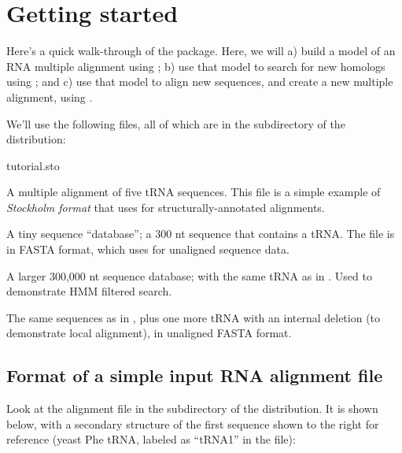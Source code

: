 \section{Getting started}

Here's a quick walk-through of the package. Here, we will
a) build a model of an RNA multiple alignment using
         ;
b) use that model to search for new homologs using
         ;
and c) use that model to align new sequences, and create a 
         new multiple alignment, using .

We'll use the following files, all of which are in the 
subdirectory of the distribution:

  \begin{sreitems}{tutorial.sto}
  \item[\prog{tutorial.sto}] A multiple alignment of five tRNA
       sequences. This file is a simple example of \emph{Stockholm
       format} that  uses for structurally-annotated alignments.
  \item[\prog{tutorial.db}]  A tiny sequence ``database''; a 300 nt sequence
       that contains a tRNA. The file is
       in FASTA format, which  uses for unaligned sequence
       data.
  \item[\prog{tutorial.big.db}]  A larger 300,000 nt sequence database; 
       with the same tRNA as in . Used to
       demonstrate HMM filtered search. 
  \item[\prog{tutorial.fa}] The same sequences as in , plus
       one more tRNA with an internal deletion (to demonstrate local alignment),
       in unaligned FASTA format.
  \end{sreitems}

\subsection{Format of a simple input RNA alignment file}

Look at the alignment file  in the 
subdirectory of the  distribution. It is shown
below, with a secondary structure of the first sequence shown to the
right for reference (yeast Phe tRNA, labeled as ``tRNA1'' in the
file):

